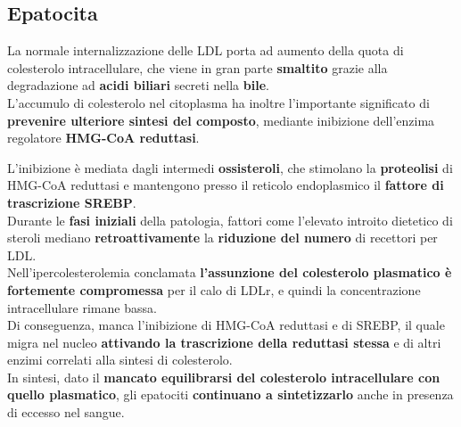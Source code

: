 \documentclass[a4paper, 12pt]{article}
\begin{document}
\begin{titlepage}
\subsection{Epatocita}
La normale internalizzazione delle LDL porta ad aumento della quota di colesterolo intracellulare, che viene in gran parte \textbf{smaltito} grazie alla degradazione ad \textbf{acidi biliari} secreti nella \textbf{bile}.\\
L'accumulo di colesterolo nel citoplasma ha inoltre l'importante significato di \textbf{prevenire ulteriore sintesi del composto}, mediante inibizione dell'enzima regolatore \textbf{HMG-CoA reduttasi}.

\begin{center}
\end{center}

L'inibizione è mediata dagli intermedi \textbf{ossisteroli}, che stimolano la \textbf{proteolisi} di HMG-CoA reduttasi e mantengono presso il reticolo endoplasmico il \textbf{fattore di trascrizione SREBP}.\\
Durante le \textbf{fasi iniziali} della patologia, fattori come l'elevato introito dietetico di steroli mediano \textbf{retroattivamente} la \textbf{riduzione del numero} di recettori per LDL.\\
Nell'ipercolesterolemia conclamata \textbf{l'assunzione del colesterolo plasmatico è fortemente compromessa} per il calo di LDLr, e quindi la concentrazione intracellulare rimane bassa.\\
Di conseguenza, manca l'inibizione di HMG-CoA reduttasi e di SREBP, il quale migra nel nucleo \textbf{attivando la trascrizione della reduttasi stessa} e di altri enzimi correlati alla sintesi di colesterolo.\\
In sintesi, dato il \textbf{mancato equilibrarsi del colesterolo intracellulare con quello plasmatico}, gli epatociti \textbf{continuano a sintetizzarlo} anche in presenza di eccesso nel sangue.



\end{titlepage}
\end{document}
